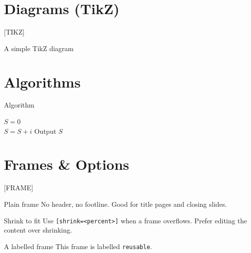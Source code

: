 \documentclass[aspectratio=169]{beamer}
\begin{document}
\section{Diagrams (TikZ)}  [TIKZ]
\begin{frame}{A simple TikZ diagram}
    \centering
\end{frame}

\section{Algorithms}
\begin{frame}[label=algo]{Algorithm}
    \begin{algorithm}[H]
        \caption{Sum of $N$ numbers}
        $S = 0$\\
        {
            $S = S + i$
        }
        Output $S$
    \end{algorithm}
\end{frame}

\section{Frames \& Options}  [FRAME]
\begin{frame}[plain]{Plain frame}
    No header, no footline. Good for title pages and closing slides.
\end{frame}

\begin{frame}[shrink=10]{Shrink to fit}
    Use \texttt{[shrink=<percent>]} when a frame overflows. Prefer
    editing the content over shrinking.
\end{frame}

\begin{frame}[label=reusable]{A labelled frame}
    This frame is labelled \texttt{reusable}.
\end{frame}
\end{document}
